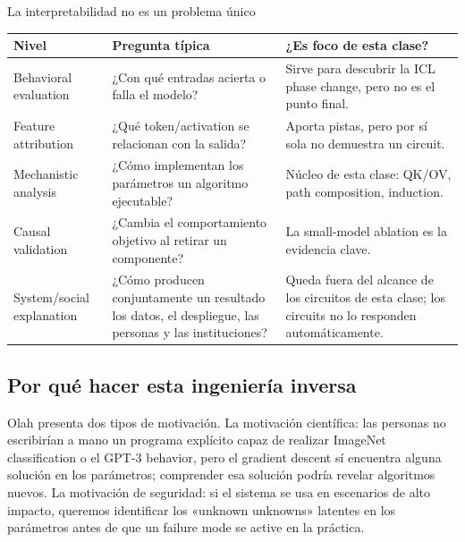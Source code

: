 
\begin{knowledgebox}{La interpretabilidad no es un problema único}
\begin{tabularx}{\textwidth}{L{0.24\textwidth}X X}
\toprule
Nivel & Pregunta típica & ¿Es foco de esta clase? \\
\midrule
Behavioral evaluation & ¿Con qué entradas acierta o falla el modelo? & Sirve para descubrir la ICL phase change, pero no es el punto final. \\
Feature attribution & ¿Qué token/activation se relacionan con la salida? & Aporta pistas, pero por sí sola no demuestra un circuit. \\
Mechanistic analysis & ¿Cómo implementan los parámetros un algoritmo ejecutable? & Núcleo de esta clase: QK/OV, path composition, induction. \\
Causal validation & ¿Cambia el comportamiento objetivo al retirar un componente? & La small-model ablation es la evidencia clave. \\
System/social explanation & ¿Cómo producen conjuntamente un resultado los datos, el despliegue, las personas y las instituciones? & Queda fuera del alcance de los circuitos de esta clase; los circuits no lo responden automáticamente. \\
\bottomrule
\end{tabularx}
\end{knowledgebox}

\subsection{Por qué hacer esta ingeniería inversa}

Olah presenta dos tipos de motivación. La motivación científica: las personas no escribirían a mano un programa explícito capaz de realizar ImageNet classification o el GPT-3 behavior, pero el gradient descent sí encuentra alguna solución en los parámetros; comprender esa solución podría revelar algoritmos nuevos. La motivación de seguridad: si el sistema se usa en escenarios de alto impacto, queremos identificar los «unknown unknowns» latentes en los parámetros antes de que un failure mode se active en la práctica.

